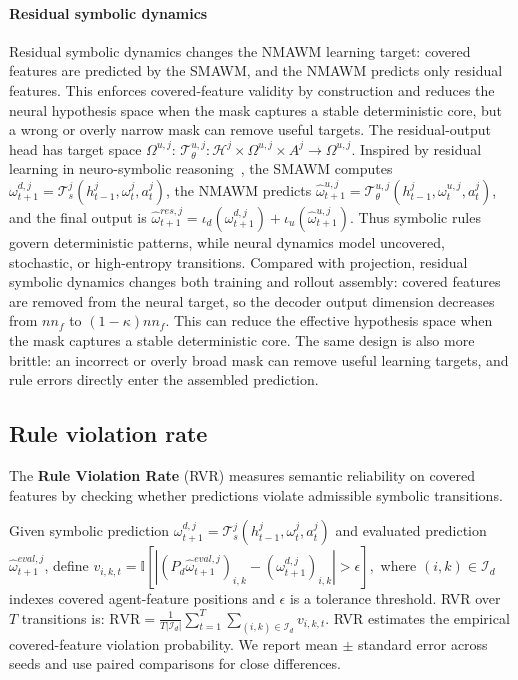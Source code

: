 \documentclass{article}
\theoremstyle{plain}
\theoremstyle{definition}
\theoremstyle{remark}
\begin{document}
\paragraph{Residual symbolic dynamics}
\label{sec:residual_symbolic_dynamics}

Residual symbolic dynamics changes the NMAWM learning target: covered features are predicted by the SMAWM, and the NMAWM predicts only residual features. This enforces covered-feature validity by construction and reduces the neural hypothesis space when the mask captures a stable deterministic core, but a wrong or overly narrow mask can remove useful targets. The residual-output head has target space $\Omega^{u,j}$:
$    \mathcal{T}^{u,j}_{\theta}: \mathcal{H}^j \times \Omega^{u,j} \times A^j \rightarrow \Omega^{u,j}.
$
Inspired by residual learning in neuro-symbolic reasoning~\cite{garcez2023neurosymbolic, balloch2023neurosymbolicworldmodelsadapting}, the SMAWM computes $\omega^{d,j}_{t+1} = \mathcal{T}^j_s(h^j_{t-1}, \omega^j_t, a^j_t)$, the NMAWM predicts $\hat{\omega}^{u,j}_{t+1} = \mathcal{T}^{u,j}_{\theta}(h^j_{t-1}, \omega^{u,j}_t, a^j_t)$, and the final output is
$
  \hat{\omega}^{res,j}_{t+1} =
  \iota_d(\omega^{d,j}_{t+1}) + \iota_u(\hat{\omega}^{u,j}_{t+1}).
$
Thus symbolic rules govern deterministic patterns, while neural dynamics model uncovered, stochastic, or high-entropy transitions. Compared with projection, residual symbolic dynamics changes both training and rollout assembly: covered features are removed from the neural target, so the decoder output dimension decreases from $n n_f$ to $(1-\kappa)n n_f$. This can reduce the effective hypothesis space when the mask captures a stable deterministic core. The same design is also more brittle: an incorrect or overly broad mask can remove useful learning targets, and rule errors directly enter the assembled prediction.

\subsection{Rule violation rate}
\label{sec:rvr}

The \textbf{Rule Violation Rate} (RVR) measures semantic reliability on covered features by checking whether predictions violate admissible symbolic transitions.

Given symbolic prediction $\omega^{d,j}_{t+1} = \mathcal{T}^j_s(h^j_{t-1}, \omega^j_t, a^j_t)$ and evaluated prediction $\hat{\omega}^{eval,j}_{t+1}$, define
$
  v_{i,k,t} = \mathbb{I}\left[\left| (P_d\hat{\omega}^{eval,j}_{t+1})_{i,k} - (\omega^{d,j}_{t+1})_{i,k} \right| > \epsilon \right],
$
where $(i,k)\in\mathcal{I}_d$ indexes covered agent-feature positions and $\epsilon$ is a tolerance threshold.
RVR over $T$ transitions is:
$    \text{RVR} = \frac{1}{T|\mathcal{I}_d|} \sum_{t=1}^T \sum_{(i,k)\in\mathcal{I}_d} v_{i,k,t}.
$
RVR estimates the empirical covered-feature violation probability. We report mean $\pm$ standard error across seeds and use paired comparisons for close differences.
\end{document}
